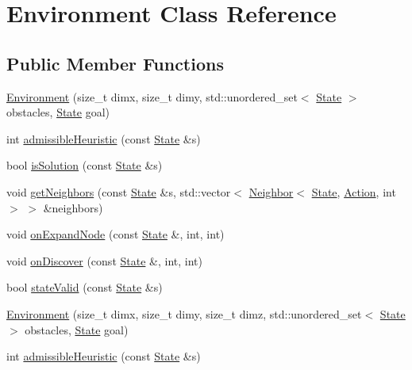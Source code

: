 \hypertarget{class_environment}{}\section{Environment Class Reference}
\label{class_environment}
\subsection*{Public Member Functions}
\begin{DoxyCompactItemize}
\item 
\hyperlink{class_environment_a0ddc9c7b0862c1313b1ca99c2acb6d93}{Environment} (size\+\_\+t dimx, size\+\_\+t dimy, std\+::unordered\+\_\+set$<$ \hyperlink{struct_state}{State} $>$ obstacles, \hyperlink{struct_state}{State} goal)
\item 
int \hyperlink{class_environment_a171e702c373005a9d6e77b79daa365d9}{admissible\+Heuristic} (const \hyperlink{struct_state}{State} \&s)
\item 
bool \hyperlink{class_environment_aab14c04c6aaaf6b0d0f26f8b92d44400}{is\+Solution} (const \hyperlink{struct_state}{State} \&s)
\item 
void \hyperlink{class_environment_a4ae69480c6b9e716f282839dc4f323c0}{get\+Neighbors} (const \hyperlink{struct_state}{State} \&s, std\+::vector$<$ \hyperlink{structlib_multi_robot_planning_1_1_neighbor}{Neighbor}$<$ \hyperlink{struct_state}{State}, \hyperlink{a__star_8cpp_a8bb1ef53467e4f61410d12822d922498}{Action}, int $>$ $>$ \&neighbors)
\item 
void \hyperlink{class_environment_a37ccf718e3e1b4540dadbe89f1631ee6}{on\+Expand\+Node} (const \hyperlink{struct_state}{State} \&, int, int)
\item 
void \hyperlink{class_environment_a0c694f293bf62ef33dab4b878893bacf}{on\+Discover} (const \hyperlink{struct_state}{State} \&, int, int)
\item 
bool \hyperlink{class_environment_ad21a790ab0279b0f5b445e1f460dc971}{state\+Valid} (const \hyperlink{struct_state}{State} \&s)
\item 
\hyperlink{class_environment_aa5836d453e17e782e72d48437799e12d}{Environment} (size\+\_\+t dimx, size\+\_\+t dimy, size\+\_\+t dimz, std\+::unordered\+\_\+set$<$ \hyperlink{struct_state}{State} $>$ obstacles, \hyperlink{struct_state}{State} goal)
\item 
int \hyperlink{class_environment_a171e702c373005a9d6e77b79daa365d9}{admissible\+Heuristic} (const \hyperlink{struct_state}{State} \&s)
\item 

\end{DoxyCompactItemize}
